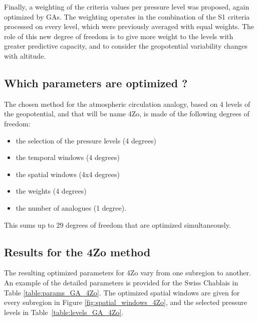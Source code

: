 \documentclass[5p]{elsarticle}
\begin{document}
Finally, a weighting of the criteria values per pressure level was proposed, again optimized by GAs. The weighting operates in the combination of the S1 criteria processed on every level, which were previously averaged with equal weights. The role of this new degree of freedom is to give more weight to the levels with greater predictive capacity, and to consider the geopotential variability changes with altitude. 


\subsection{Which parameters are optimized ?}

The chosen method for the atmospheric circulation analogy, based on 4 levels of the geopotential, and that will be name 4Zo, is made of the following degrees of freedom:

\begin{itemize}
	\setlength\itemsep{-4px}
	\item the selection of the pressure levels (4 degrees)
	\item the temporal windows (4 degrees)
	\item the spatial windows (4x4 degrees)
	\item the weights (4 degrees)
	\item the number of analogues (1 degree).
\end{itemize}

This sums up to 29 degrees of freedom that are optimized simultaneously.


\subsection{Results for the 4Zo method}

The resulting optimized parameters for 4Zo vary from one subregion to another. An example of the detailed parameters is provided for the Swiss Chablais in Table \ref{table:params_GA_4Zo}. The optimized spatial windows are given for every subregion in Figure \ref{fig:spatial_windows_4Zo}, and the selected pressure levels in Table~\ref{table:levels_GA_4Zo}. 
\end{document}
